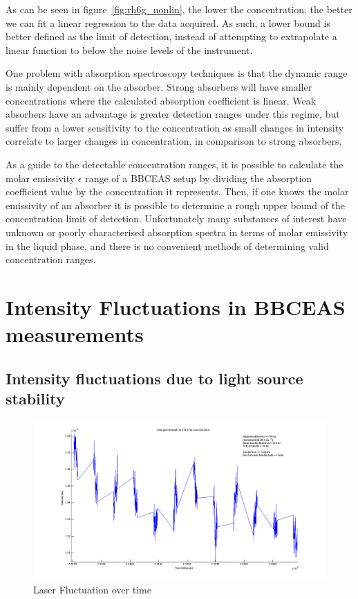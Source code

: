 As can be seen in figure~\ref{fig:rh6g_nonlin}, the lower the concentration, the
better we can fit a linear regression to the data acquired. As such, a lower
bound is better defined as the limit of detection, instead of attempting to
extrapolate a linear function to below the noise levels of the instrument.

One problem with absorption spectroscopy techniques is that the dynamic range
is mainly dependent on the absorber. Strong absorbers will have smaller
concentrations where the calculated absorption coefficient is linear. Weak
absorbers have an advantage is greater detection ranges under this regime, but
suffer from a lower sensitivity to the concentration as small changes in
intensity correlate to larger changes in concentration, in comparison to strong
absorbers.

As a guide to the detectable concentration ranges, it is possible to calculate
the molar emissivity $\epsilon$ range of a \ac{BBCEAS} setup by dividing the
absorption coefficient value by the concentration it represents. Then, if one
knows the molar emissivity of an absorber it is possible to determine a rough
upper bound of the concentration limit of detection. Unfortunately many
substances of interest have unknown or poorly characterised absorption spectra
in terms of molar emissivity in the liquid phase, and there is no convenient
methods of determining valid concentration ranges.

\section{Intensity Fluctuations in BBCEAS measurements}\label{sec:light_fluc}


\subsection{Intensity fluctuations due to light source stability}\label{subsec:laser_fluc}

\begin{figure}[h!]
\begin{center}
\includegraphics[width=\textwidth]{figures/change_in_intensity_of_576_5nm_over_one_hour.png}
\end{center}
\caption{Laser Fluctuation over time}
\label{fig:laser_fluc}
\end{figure}

